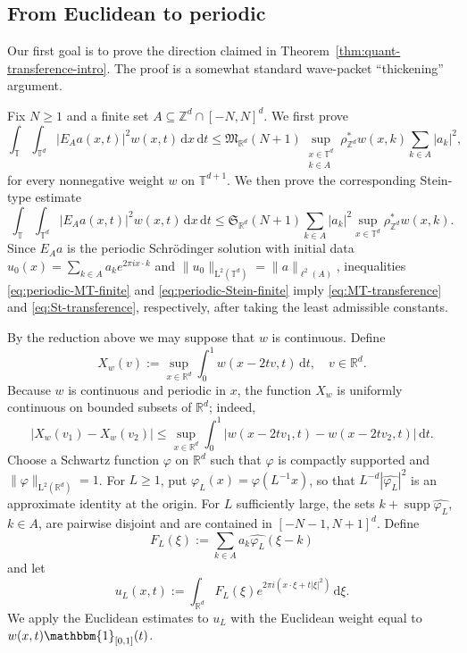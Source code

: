 \documentclass[11pt,reqno]{amsart}
\numberwithin{equation}{section}
\newcommand{\supp}{\operatorname{supp}}
\newcommand{\dd}{\,\mathrm{d}}
\renewcommand{\leq}{\leqslant}
\renewcommand{\geq}{\geqslant}
\begin{document}
\subsection{From Euclidean to periodic}
Our first goal is to prove the direction claimed in Theorem~\ref{thm:quant-transference-intro}. The proof is a somewhat standard wave-packet ``thickening'' argument.

Fix $N\geq1$ and a finite set $A\subseteq\mathbb{Z}^d\cap[-N,N]^d$. We first prove
\begin{equation}\label{eq:periodic-MT-finite}
\int_{\mathbb{T}}\int_{\mathbb{T}^d}|E_Aa(x,t)|^2w(x,t)\dd x\dd t
\leq \mathfrak{M}_{\mathbb{R}^d}(N+1)\sup_{\substack{x\in\mathbb{T}^d\\ k\in A}}\rho^{\ast}_{\mathbb{Z}^d}w(x,k)\sum_{k\in A}|a_k|^2,
\end{equation}
for every nonnegative weight $w$ on $\mathbb{T}^{d+1}$. We then prove the corresponding Stein-type estimate
\begin{equation}\label{eq:periodic-Stein-finite}
\int_{\mathbb{T}}\int_{\mathbb{T}^d}|E_Aa(x,t)|^2w(x,t)\dd x\dd t
\leq \mathfrak{S}_{\mathbb{R}^d}(N+1)\sum_{k\in A}|a_k|^2\sup_{x\in\mathbb{T}^d}\rho^{\ast}_{\mathbb{Z}^d}w(x,k).
\end{equation}
Since $E_Aa$ is the periodic Schr\"{o}dinger solution with initial data $u_0(x)=\sum_{k\in A}a_ke^{2\pi ix\cdot k}$ and $\|u_0\|_{\mathrm{L}^2(\mathbb{T}^d)}=\|a\|_{\ell^2(A)}$, inequalities \eqref{eq:periodic-MT-finite} and \eqref{eq:periodic-Stein-finite} imply \eqref{eq:MT-transference} and \eqref{eq:St-transference}, respectively, after taking the least admissible constants.

By the reduction above we may suppose that $w$ is continuous. Define
\[ X_w(v):=\sup_{x\in\mathbb{R}^d}\int_0^1w(x-2tv,t)\dd t,\quad v\in\mathbb{R}^d. \]
Because $w$ is continuous and periodic in $x$, the function $X_w$ is uniformly continuous on bounded subsets of $\mathbb{R}^d$; indeed,
\[ |X_w(v_1)-X_w(v_2)|
\leq \sup_{x\in\mathbb{R}^d}\int_0^1|w(x-2tv_1,t)-w(x-2tv_2,t)|\dd t. \]
Choose a Schwartz function $\varphi$ on $\mathbb{R}^d$ such that $\widehat{\varphi}$ is compactly supported and $\|\varphi\|_{\mathrm{L}^2(\mathbb{R}^d)}=1$. For $L\geq1$, put $\varphi_L(x)=\varphi(L^{-1}x)$, so that $L^{-d}|\widehat{\varphi_L}|^2$ is an approximate identity at the origin. For $L$ sufficiently large, the sets $k+\supp\widehat{\varphi_L}$, $k\in A$, are pairwise disjoint and are contained in $[-N-1,N+1]^d$. Define
\[ F_L(\xi):=\sum_{k\in A}a_k\widehat{\varphi_L}(\xi-k) \]
and let
\[ u_L(x,t):=\int_{\mathbb{R}^d}F_L(\xi)e^{2\pi i(x\cdot\xi+t|\xi|^2)}\dd\xi. \]
We apply the Euclidean estimates to $u_L$ with the Euclidean weight equal to $w(x,t)\mathbbm{1}_{[0,1]}(t)$.
\end{document}
